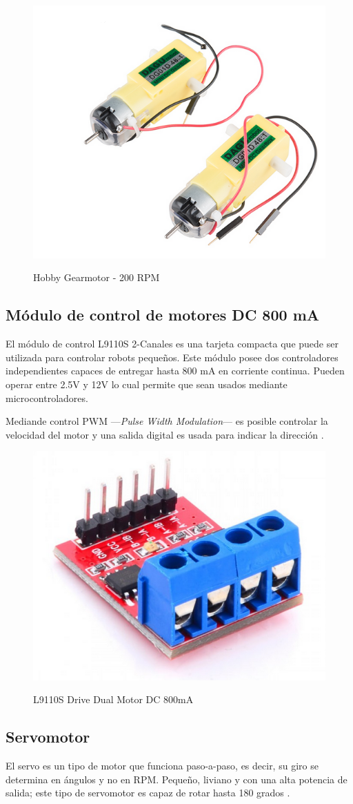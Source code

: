 \begin{figure}[H]
    \centering
    \includegraphics[width = 7 cm]{imagenes/gearmotor.PNG}
    \caption{Hobby Gearmotor - 200 RPM}
    \cite{motor_dc}
\end{figure}

\subsection{Módulo de control de motores DC 800 mA}

El módulo de control L9110S 2-Canales es una tarjeta compacta que puede ser utilizada para controlar robots pequeños. Este módulo posee dos controladores independientes capaces de entregar hasta 800 mA en corriente continua. Pueden operar entre 2.5V y 12V lo cual permite que sean usados mediante microcontroladores.

Mediande control PWM ---\textit{Pulse Width Modulation}--- es posible controlar la velocidad del motor y una salida digital es usada para indicar la dirección \cite{driver}.

\begin{figure}[H]
    \centering
    \includegraphics[width = 7 cm]{imagenes/driver.PNG}
    \caption{L9110S Drive Dual Motor DC 800mA}
    \cite{driver}
\end{figure}


\subsection{Servomotor}
El servo es un tipo de motor que funciona paso-a-paso, es decir, su giro se determina en ángulos y no en RPM. Pequeño, liviano y con una alta potencia de salida; este tipo de servomotor es capaz de rotar hasta 180 grados \cite{servo}.


